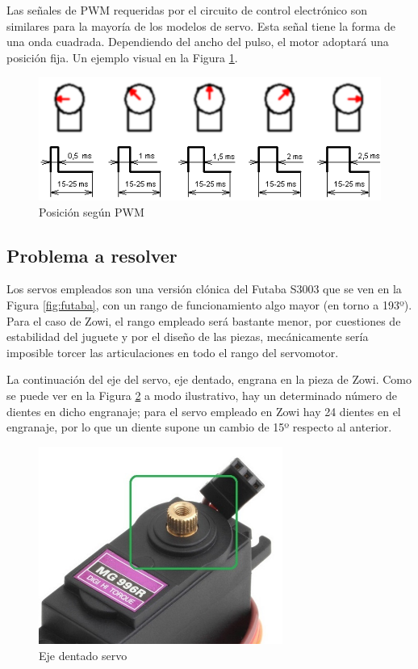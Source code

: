 Las señales de PWM requeridas por el circuito de control electrónico son similares para la mayoría de los modelos de servo. Esta señal tiene la forma de una onda cuadrada. Dependiendo del ancho del pulso, el motor adoptará una posición fija. Un ejemplo visual en la Figura \ref{fig:ServoPWM}.

\begin{figure}[h]
\centering
\includegraphics[width=140mm]{Figures/servo-pwm.png}
\caption[Posición según PWM]{Posición según PWM}
\label{fig:ServoPWM}
\end{figure}

\subsection{Problema a resolver}
Los servos empleados son una versión clónica del Futaba S3003 que se ven en la Figura \ref{fig:futaba}, con un rango de funcionamiento algo mayor (en torno a 193º). Para el caso de Zowi, el rango empleado será bastante menor, por cuestiones de estabilidad del juguete y por el diseño de las piezas, mecánicamente sería imposible torcer las articulaciones en todo el rango del servomotor.

La continuación del eje del servo, eje dentado, engrana en la pieza de Zowi. Como se puede ver en la Figura \ref{fig:EjeServo} a modo ilustrativo, hay un determinado número de dientes en dicho engranaje; para el servo empleado en Zowi hay 24 dientes en el engranaje, por lo que un diente supone un cambio de 15º respecto al anterior.

\begin{figure}
\centering
\includegraphics[width=80mm]{Figures/servo-shft.jpg}
\caption[Eje dentado servo]{Eje dentado servo}
\label{fig:EjeServo}
\end{figure}

